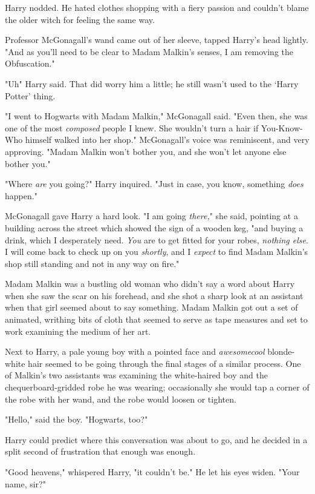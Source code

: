 Harry nodded. He hated clothes shopping with a fiery passion and couldn't blame
the older witch for feeling the same way.

Professor McGonagall's wand came out of her sleeve, tapped Harry's head
lightly. "And as you'll need to be clear to Madam Malkin's senses, I am
removing the Obfuscation."

"Uh{\el}" Harry said. That did worry him a little; he still wasn't used to
the `Harry Potter' thing.

"I went to Hogwarts with Madam Malkin," McGonagall said. "Even then, she was
one of the most \emph{composed} people I knew. She wouldn't turn a hair if
You-Know-Who himself walked into her shop." McGonagall's voice was reminiscent,
and very approving. "Madam Malkin won't bother you, and she won't let anyone
else bother you."

"Where \emph{are} you going?" Harry inquired. "Just in case, you know,
something \emph{does} happen."

McGonagall gave Harry a hard look. "I am going \emph{there,}" she said,
pointing at a building across the street which showed the sign of a wooden keg,
"and buying a drink, which I desperately need. \emph{You} are to get fitted for
your robes, \emph{nothing else}. I will come back to check up on you
\emph{shortly}, and I \emph{expect} to find Madam Malkin's shop still standing
and not in any way on fire."

Madam Malkin was a bustling old woman who didn't say a word about Harry when
she saw the scar on his forehead, and she shot a sharp look at an assistant
when that girl seemed about to say something. Madam Malkin got out a set of
animated, writhing bits of cloth that seemed to serve as tape measures and set
to work examining the medium of her art.

Next to Harry, a pale young boy with a pointed face and \emph{awesomecool}
blonde-white hair seemed to be going through the final stages of a similar
process. One of Malkin's two assistants was examining the white-haired boy and
the chequerboard-gridded robe he was wearing; occasionally she would tap a
corner of the robe with her wand, and the robe would loosen or tighten.

"Hello," said the boy. "Hogwarts, too?"

Harry could predict where this conversation was about to go, and he decided in
a split second of frustration that enough was enough.

"Good heavens," whispered Harry, "it couldn't be." He let his eyes widen.
"Your{\el} name, sir?"

